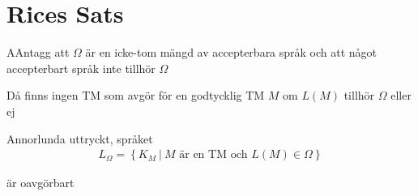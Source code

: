 \section{Rices Sats}\par
\begin{theo}
  AAntagg att $\Omega$ är en icke-tom mängd av accepterbara språk och att något accepterbart språk inte tillhör $\Omega$ 
  \par\bigskip
  \noindent Då finns ingen TM som avgör för en godtycklig TM $M$ om $L(M)$ tillhör $\Omega$ eller ej
  \par\bigskip
  \noindent Annorlunda uttryckt, språket
  \begin{equation*}
    \begin{gathered}
      L_\Omega = \left\{K_M\:|\:M\text{ är en TM och }L(M)\in\Omega\right\}
    \end{gathered}
  \end{equation*}\par
  \noindent är oavgörbart
\end{theo}
\par\bigskip

